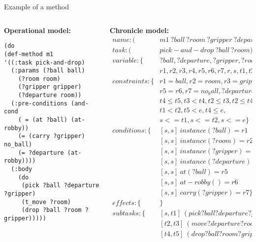 \begin{frame}[fragile]{Example of a method}
\begin{columns}[T] %
\begin{column}{.48\textwidth}
\small
\textbf{Operational model:}
\tiny
\begin{lstlisting}(do
(def-method m1
'((:task pick-and-drop)
  (:params (?ball ball)
    (?room room)
    (?gripper gripper)
    (?departure room))
  (:pre-conditions (and-cond 
    ( = (at ?ball) (at-robby))
    (= (carry ?gripper) no_ball)
    (= ?departure (at-robby))))
  (:body
    (do
     (pick ?ball ?departure ?gripper)
     (t_move ?room)
     (drop ?ball ?room ?gripper)))))
\end{lstlisting}
\end{column}%
\hfill%
\begin{column}{.48\textwidth}
\small
\textbf{Chronicle model:}
\tiny
\begin{align*}
name: (&m1\ ?ball\ ?room\ ?gripper\ ?departure)\\
task: (&pick-and-drop\ ?ball\ ?room)\\
variable: \{&?ball,?departure,?gripper,?room,s,e,prez,\\
&r1,r2,r3,r4,r5,r6,r7,r,s,t1,t2,t3,t4,t5\}\\
constraints: \{&r1 = ball, r2 = room, r3 = gripper, r4 = room \\
	&r5 = r6, r7 = no_ball, ?departure = r6, r = true, \\
	&t4 \leq t5, t3 < t4, t2 \leq t3, t2 \leq t4,\\
	&t1 < t2, t5 < e, t4 \leq e,\\
	&s <= t1, s <= t2, s <= e\}\\
conditions: \{&[s,s]\ instance(?ball) = r1 \\
	&[s,s]\ instance(?room) = r2 \\
	&[s,s]\ instance(?gripper) = r3 \\
	&[s,s]\ instance(?departure) = r4 \\
	&[s,s]\ at (?ball) = r5 \\
	&[s,s]\ at-robby() = r6 \\
	&[s,s]\ carry (?gripper) = r7 \}\\
effects: \{&\} \\
subtasks: \{&[s,t1]\ (pick ?ball ?departure ?gripper)\\
	&[t2,t3]\ (move ?departure ?room) \\
	&[t4,t5]\ (drop ?ball ?room ?gripper)\}
\end{align*}
\end{column}
\end{columns}
\end{frame}


